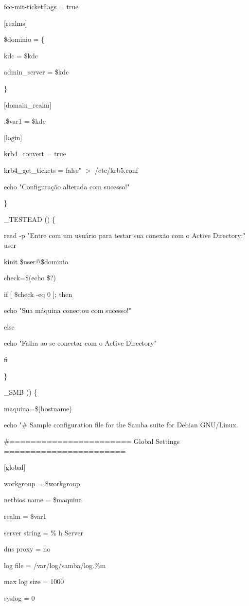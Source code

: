 {      fcc-mit-ticketflags = true

   [realms]

   		\$dominio = \{

        	kdc = \$kdc
           
            admin\_server = \$kdc

           \}  
             
   [domain\_realm]

   		.\$var1 = \$kdc

   [login]

   		krb4\_convert = true

   		krb4\_get\_tickets = false" $>$ /etc/krb5.conf
 
   echo "Configuração alterada com sucesso!"

\}

\_TESTEAD () \{

   read -p "Entre com um usuário para testar sua conexão com o Active Directory:" user

   kinit \$user$@$\$dominio

    

   check=\$(echo \$?)

   if [ \$check -eq 0 ]; then

      echo "Sua máquina conectou com sucesso!"

   else

      echo "Falha ao se conectar com o Active Directory"

   fi

\}

\_SMB () \{

    

   maquina=\$(hostname)

   echo "\# Sample configuration file for the Samba suite for Debian GNU/Linux.

   \#======================= Global Settings =======================

   [global]

      workgroup = \$workgroup

      netbios name = \$maquina

      realm = \$var1

      server string = \% h Server

      dns proxy = no

  	  log file = /var/log/samba/log.\%m  

	  max log size = 1000

	  syslog = 0  

}
